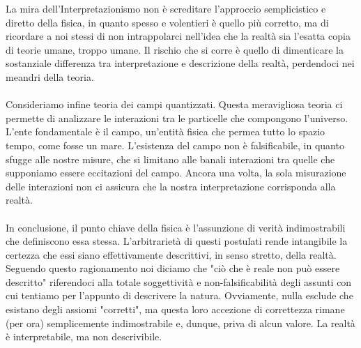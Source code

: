 \documentclass[]{article}
\begin{document}
	La mira dell'Interpretazionismo non è screditare l'approccio semplicistico e diretto della fisica, in quanto spesso e volentieri è quello più corretto, ma di ricordare a noi stessi di non intrappolarci nell'idea che la realtà sia l'esatta copia di teorie umane, troppo umane.  Il rischio che si corre è quello di dimenticare la sostanziale differenza tra interpretazione e descrizione della realtà, perdendoci nei meandri della teoria.\\
	\\
	Consideriamo infine teoria dei campi quantizzati. Questa meravigliosa teoria ci permette di analizzare le interazioni tra le particelle che compongono l'universo. L'ente fondamentale è il campo, un'entità fisica che permea tutto lo spazio tempo, come fosse un mare. L'esistenza del campo non è falsificabile, in quanto sfugge alle nostre misure, che si limitano alle banali interazioni tra quelle che supponiamo essere eccitazioni del campo. Ancora una volta, la sola misurazione delle interazioni non ci assicura che la nostra interpretazione corrisponda alla realtà. \\
	\\
	In conclusione, il punto chiave della fisica è l'assunzione di verità indimostrabili che definiscono essa stessa. L'arbitrarietà di questi postulati rende intangibile la certezza che essi siano effettivamente descrittivi, in senso stretto, della realtà. Seguendo questo ragionamento noi diciamo che "ciò che è reale non può essere descritto" riferendoci alla totale soggettività e non-falsificabilità degli assunti con cui tentiamo per l'appunto di descrivere la natura. Ovviamente, nulla esclude che esistano degli assiomi "corretti", ma questa loro accezione di correttezza rimane (per ora) semplicemente indimostrabile e, dunque, priva di alcun valore. La realtà è interpretabile, ma non descrivibile.
	
\end{document}
